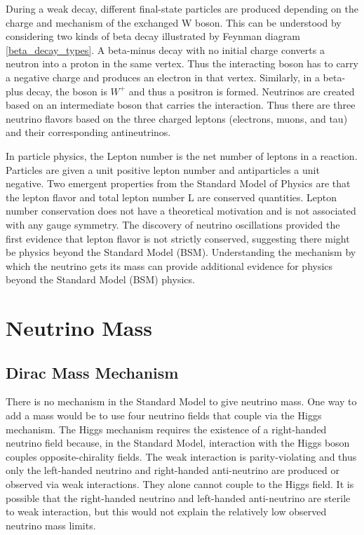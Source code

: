 
During a weak decay, different final-state particles are produced depending on the charge and mechanism of the exchanged W boson. This can be understood by considering two kinds of beta decay illustrated by Feynman diagram \ref{beta_decay_types}. A beta-minus decay with no initial charge converts a neutron into a proton in the same vertex. Thus the interacting boson has to carry a negative charge and produces an electron in that vertex. Similarly, in a beta-plus decay, the boson is $W^+$ and thus a positron is formed. Neutrinos are created based on an intermediate boson that carries the interaction. Thus there are three neutrino flavors based on the three charged leptons (electrons, muons, and tau) and their corresponding antineutrinos. 




In particle physics, the Lepton number is the net number of leptons in a reaction. Particles are given a unit positive lepton number and antiparticles a unit negative. Two emergent properties from the Standard Model of Physics are that the lepton flavor and total lepton number L are conserved quantities. Lepton number conservation does not have a theoretical motivation and is not associated with any gauge symmetry. The discovery of neutrino oscillations provided the first evidence that lepton flavor is not strictly conserved, suggesting there might be physics beyond the Standard Model (BSM). Understanding the mechanism by which the neutrino gets its mass can provide additional evidence for physics beyond the Standard Model (BSM) physics. 

\section{Neutrino Mass}
\subsection{Dirac Mass Mechanism}
There is no mechanism in the Standard Model to give neutrino mass. One way to add a mass would be to use four neutrino fields that couple via the Higgs mechanism. The Higgs mechanism requires the existence of a right-handed neutrino field because, in the Standard Model, interaction with the Higgs boson couples opposite-chirality fields. The weak interaction is parity-violating and thus only the left-handed neutrino and right-handed anti-neutrino are produced or observed via weak interactions. They alone cannot couple to the Higgs field. It is possible that the right-handed neutrino and left-handed anti-neutrino are sterile to weak interaction, but this would not explain the relatively low observed neutrino mass limits. 

